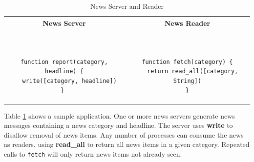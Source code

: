 \documentclass[lnicst]{svmultln}
\begin{document}
\begin{table}
\scriptsize
\centering
\caption{News Server and Reader}
\begin{tabular}{|c|c|} \hline
\textbf{News Server} & \textbf{News Reader} \\ \hline
\begin{minipage}{2.45in}
\begin{verbatim}


function report(category, headline) {
   write([category, headline])
} 
\end{verbatim}
\end{minipage}
&
\begin{minipage}{2.45in}
\begin{verbatim}


function fetch(category) {
   return read_all([category, String])
}
\end{verbatim}
\end{minipage}
\\ \hline
\end{tabular}
\label{fig:newsreader}
\end{table}

Table \ref{fig:newsreader} shows a sample application. One or more news servers generate news messages containing a news category and headline. The server uses \textbf{write} to disallow removal of news items. Any number of processes can consume the news as readers, using \textbf{read\_all} to return all news items in a given category. Repeated calls to \texttt{fetch} will only return news items not already seen.

   


\end{document}
